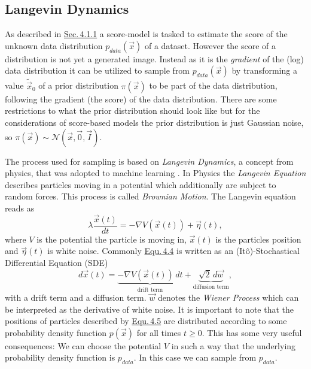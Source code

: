 \subsection{Langevin Dynamics} \label{sec:4.1.2}
As described in \hyperref[sec:4.1.1]{Sec.\,4.1.1} a score-model is tasked to estimate the score of the unknown data distribution $p_{data}(\vec{x})$ of a dataset. However the score of a distribution is not yet a generated image. Instead as it is the \textit{gradient} of the (log) data distribution it can be utilized to sample from $p_{data}(\vec{x})$ by transforming a value $\tilde{\vec{x}}_0$ of a prior distribution $\pi(\vec{x})$ to be part of the data distribution, following the gradient (the score) of the data distribution. There are some restrictions to what the prior distribution should look like but for the considerations of score-based models the prior distribution is just Gaussian noise, so $\pi(\vec{x})\sim\mathcal{N}(\vec{x}, \vec{0}, \vec{I})$.

The process used for sampling is based on \textit{Langevin Dynamics}, a concept from physics, that was adopted to machine learning \cite{langevin1, langevin2}. In Physics the \textit{Langevin Equation} describes particles moving in a potential which additionally are subject to random forces. This process is called \textit{Brownian Motion}. The Langevin equation reads as 
%
\begin{equation} \label{equ:4.4}
    \lambda \frac{\vec{x}(t)}{dt}=-\nabla V(\vec{x}(t))+\vec{\eta}(t),
\end{equation}
%
where $V$ is the potential the particle is moving in, $\vec{x}(t)$ is the particles position and $\vec{\eta}(t)$ is white noise. Commonly \hyperref[equ:4.4]{Equ.\,4.4} is written as an (Itô)-Stochastical Differential Equation (SDE)
%
\begin{equation} \label{equ:4.5}
    d\vec{x}(t)=\underbrace{-\nabla V(\vec{x}(t))\,dt}_\text{drift term}+\underbrace{\sqrt{2}\,d\vec{w}}_\text{diffusion term},
\end{equation}
%
with a drift term and a diffusion term. $\vec{w}$ denotes the \textit{Wiener Process} \cite{gardiner} which can be interpreted as the derivative of white noise. It is important to note that the positions of particles described by \hyperref[equ:4.5]{Equ.\,4.5} are distributed according to some probability density function $p(\vec{x})$ for all times $t\geq0$. This has some very useful consequences: We can choose the potential $V$ in such a way that the underlying probability density function is $p_{data}$. In this case we can sample from $p_{data}$.

